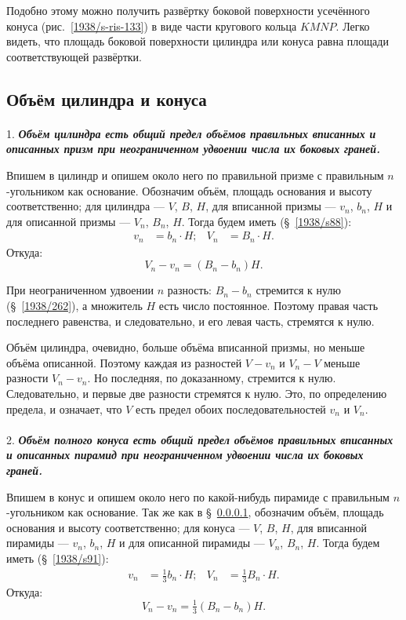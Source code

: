Подобно этому можно получить развёртку боковой поверхности усечённого конуса (рис.~\ref{1938/s-ris-133}) в виде части кругового кольца $KMNP$.
Легко видеть, что площадь боковой поверхности цилиндра или конуса равна площади соответствующей развёртки.



\subsection*{Объём цилиндра и конуса}

\paragraph{}\label{1914/470}  1. 
\textbf{\emph{Объём цилиндра есть общий предел объёмов правильных вписанных и описанных призм при неограниченном удвоении числа их боковых граней.}}


Впишем в цилиндр и опишем около него по правильной призме с правильным $n$-угольником как основание.
Обозначим объём, площадь основания и высоту соответственно; 
для цилиндра — $V$, $B$, $H$, 
для вписанной призмы — $v_n$, $b_n$, $H$ 
и для описанной призмы — $V_n$, $B_n$, $H$.
Тогда будем иметь (§~\ref{1938/s88}): 
\begin{align*}
v_n&=b_n\cdot H;
&
V_n&=B_n\cdot H.
\end{align*}
Откуда:
\[V_n-v_n=(B_n-b_n)H.\]

При неограниченном удвоении $n$ разность: $B_n-b_n$ стремится к нулю (§~\ref{1938/262}), а множитель $H$ есть число постоянное.
Поэтому правая часть последнего равенства, и следовательно, и его левая часть, стремятся к нулю.

Объём цилиндра, очевидно, больше объёма вписанной призмы, но меньше объёма описанной.
Поэтому каждая из разностей $V-v_n$ и $V_n-V$ меньше разности $V_n-v_n$. 
Но последняя, по доказанному, стремится к нулю.
Следовательно, и первые две разности стремятся к нулю.
Это, по определению предела, и означает, что $V$ есть предел обоих последовательностей $v_n$ и $V_n$.

\paragraph{}\label{1914/471}  2. 
\textbf{\emph{Объём полного конуса есть общий предел объёмов правильных вписанных и описанных пирамид при неограниченном удвоении числа их боковых граней.}}

Впишем в конус и опишем около него по какой-нибудь пирамиде с правильным $n$-угольником как основание.
Так же как в §~\ref{1914/470}, обозначим объём, площадь основания и высоту соответственно; 
для конуса — $V$, $B$, $H$, 
для вписанной пирамиды — $v_n$, $b_n$, $H$ 
и для описанной пирамиды — $V_n$, $B_n$, $H$.
Тогда будем иметь (§~\ref{1938/s91}): 
\begin{align*}
v_n&=\tfrac13 b_n\cdot H;
&
V_n&=\tfrac13 B_n\cdot H.\end{align*}
Откуда:
\[V_n-v_n=\tfrac13(B_n-b_n)H.\]

